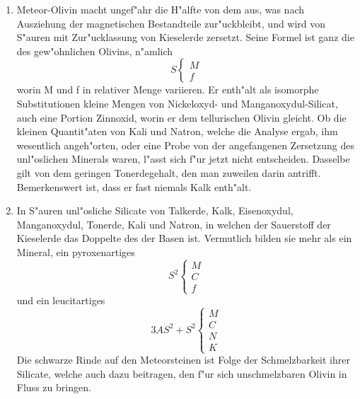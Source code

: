 \documentclass[a4paper, 11pt, oneside]{article}
\begin{document}
\begin{enumerate}
    \item Meteor-Olivin macht ungef"ahr die H"alfte von dem aus, was nach Ausziehung der magnetischen Bestandteile zur"uckbleibt, und wird von S"auren mit Zur"ucklassung von Kieselerde zersetzt. Seine Formel ist ganz die des gew"ohnlichen Olivins, n"amlich
    \normalsize
    \begin{equation*}
        S
        \begin{cases}
          M\\      
          f
        \end{cases}
    \end{equation*}
    \LARGE
    worin M und f in relativer Menge variieren. Er enth"alt als isomorphe Substitutionen kleine Mengen von Nickeloxyd- und Manganoxydul-Silicat, auch eine Portion Zinnoxid, worin er dem tellurischen Olivin gleicht. Ob die kleinen Quantit"aten von Kali und Natron, welche die Analyse ergab, ihm wesentlich angeh"orten, oder eine Probe von der angefangenen Zersetzung des unl"oslichen Minerals waren, l"asst sich f"ur jetzt nicht entscheiden. Dasselbe gilt von dem geringen Tonerdegehalt, den man zuweilen darin antrifft. Bemerkenswert ist, dass er fast niemals Kalk enth"alt.
    \item In S"auren unl"osliche Silicate von Talkerde, Kalk, Eisenoxydul, Manganoxydul, Tonerde, Kali und Natron, in welchen der Sauerstoff der Kieselerde das Doppelte des der Basen ist. Vermutlich bilden sie mehr als ein Mineral, ein pyroxenartiges
    \normalsize
    \begin{equation*}
        S^2
        \begin{cases}
          M\\
          C\\
          f
        \end{cases}
    \end{equation*}
    \LARGE
    und ein leucitartiges
    \normalsize
    \begin{equation*}
        3AS^2 + S^2
        \begin{cases}
          M\\
          C\\
          N\\
          K
        \end{cases}
    \end{equation*}
    \LARGE
    Die schwarze Rinde auf den Meteorsteinen ist Folge der Schmelzbarkeit ihrer Silicate, welche auch dazu beitragen, den f"ur sich unschmelzbaren Olivin in Fluss zu bringen.
        

\end{enumerate}
\end{document}
